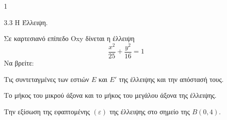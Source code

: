 \begin{ylh}{1}
    \item 3.3 Η Έλλειψη.
\end{ylh}
Σε καρτεσιανό επίπεδο Οxy δίνεται η έλλειψη
\[ \frac{x^2}{25} + \frac{y^2}{16} = 1 \]
Να βρείτε:
\begin{alist}
\item Τις συντεταγμένες των εστιών $E$ και $E'$ της έλλειψης και την απόστασή τους. 
\item Το μήκος του μικρού άξονα και το μήκος του μεγάλου άξονα της έλλειψης. 
\item Την εξίσωση της εφαπτομένης $(\varepsilon)$ της έλλειψης στο σημείο της $B(0,4)$. 
\end{alist}
